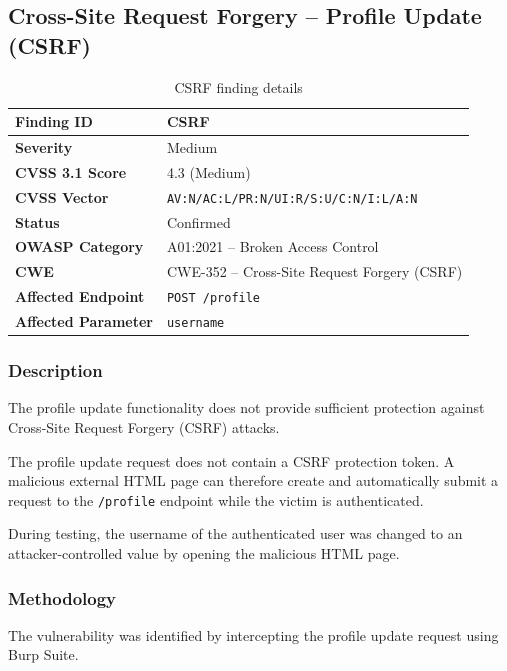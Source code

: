 \subsection*{Cross-Site Request Forgery -- Profile Update (CSRF)}

\begin{table}[H]
\centering
\begin{tabular}{|l|p{10cm}|}
\hline
\textbf{Finding ID} & CSRF \\
\hline
\textbf{Severity} & Medium \\
\hline
\textbf{CVSS 3.1 Score} & 4.3 (Medium) \\
\hline
\textbf{CVSS Vector} & \texttt{AV:N/AC:L/PR:N/UI:R/S:U/C:N/I:L/A:N} \\
\hline
\textbf{Status} & Confirmed \\
\hline
\textbf{OWASP Category} & A01:2021 -- Broken Access Control \\
\hline
\textbf{CWE} & CWE-352 -- Cross-Site Request Forgery (CSRF) \\
\hline
\textbf{Affected Endpoint} & \texttt{POST /profile} \\
\hline
\textbf{Affected Parameter} & \texttt{username} \\
\hline
\end{tabular}
\caption{CSRF finding details}
\end{table}

\subsubsection*{Description}

The profile update functionality does not provide sufficient
protection against Cross-Site Request Forgery (CSRF) attacks.

The profile update request does not contain a CSRF protection token.
A malicious external HTML page can therefore create and automatically
submit a request to the \texttt{/profile} endpoint while the victim
is authenticated.

During testing, the username of the authenticated user was changed
to an attacker-controlled value by opening the malicious HTML page.

\subsubsection*{Methodology}

The vulnerability was identified by intercepting the profile update
request using Burp Suite.

